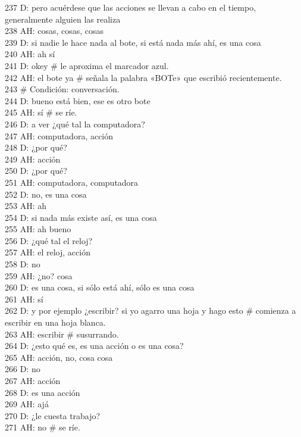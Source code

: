 237 D: pero acuérdese que las acciones se llevan a cabo en el tiempo, generalmente alguien las realiza\\
238 AH: cosas, cosas, cosas\\
239 D: si nadie le hace nada al bote, si está nada más ahí, es una cosa\\
240 AH: ah sí\\
241 D: okey \# le aproxima el marcador azul.\\
242 AH: el bote ya \# señala la palabra «BOTe» que escribió recientemente.\\
243 \# Condición: conversación.\\
244 D: bueno está bien, ese es otro bote\\
245 AH: sí \# se ríe.\\
246 D: a ver ¿qué tal la computadora?\\
247 AH: computadora, acción\\
248 D: ¿por qué?\\
249 AH: acción\\
250 D: ¿por qué?\\
251 AH: computadora, computadora\\
252 D: no, es una cosa\\
253 AH: ah\\
254 D: si nada más existe así, es una cosa\\
255 AH: ah bueno\\
256 D: ¿qué tal el reloj?\\
257 AH: el reloj, acción\\
258 D: no\\
259 AH: ¿no? cosa\\
260 D: es una cosa, si sólo está ahí, sólo es una cosa\\
261 AH: sí\\
262 D: y por ejemplo ¿escribir? si yo agarro una hoja y hago esto \# comienza a escribir en una hoja blanca.\\
263 AH: escribir \# susurrando.\\
264 D: ¿esto qué es, es una acción o es una cosa?\\
265 AH: acción, no, cosa cosa\\
266 D: no\\
267 AH: acción\\
268 D: es una acción\\
269 AH: ajá\\
270 D: ¿le cuesta trabajo?\\
271 AH: no \# se ríe.\\
